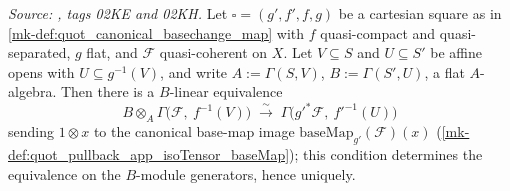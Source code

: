 \begin{theorem}
  \label{mk-thm:quot_pullback_baseMap_sectionEquiv_qc}
  \leanok

  \textit{Source: \cite{stacks-project}, tags 02KE and 02KH.}
  Let \(\square = (g', f', f, g)\) be a cartesian square as in
  \ref{mk-def:quot_canonical_basechange_map} with \(f\) quasi-compact and
  quasi-separated, \(g\) flat, and \(\mathcal F\) quasi-coherent on \(X\).
  Let \(V \subseteq S\) and \(U \subseteq S'\) be affine opens with
  \(U \subseteq g^{-1}(V)\), and write \(A := \Gamma(S, V)\),
  \(B := \Gamma(S', U)\), a flat \(A\)-algebra. Then there is a
  \(B\)-linear equivalence
  \[
    B \otimes_A \Gamma\bigl(\mathcal F,\ f^{-1}(V)\bigr)
    \;\xrightarrow{\ \sim\ }\;
    \Gamma\bigl(g'^* \mathcal F,\ f'^{-1}(U)\bigr)
  \]
  sending \(1 \otimes x\) to the canonical base-map image
  \(\mathrm{baseMap}_{g'}(\mathcal F)(x)\)
  (\ref{mk-def:quot_pullback_app_isoTensor_baseMap}); this condition
  determines the equivalence on the \(B\)-module generators, hence
  uniquely.
\end{theorem}
